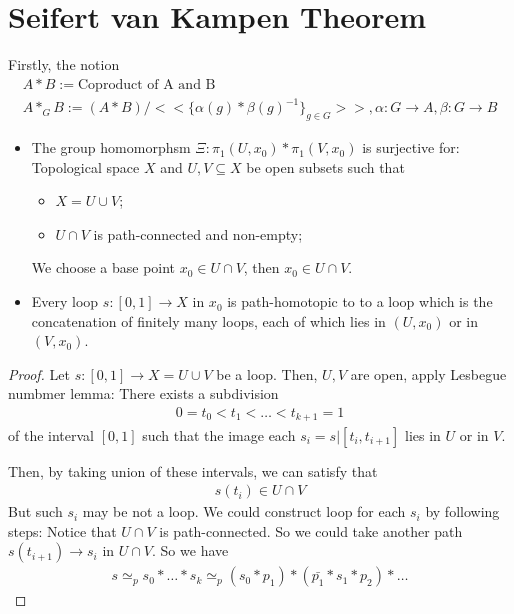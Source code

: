 \documentclass[Total.tex]{subfiles}
\begin{document}
	\section{Seifert van Kampen Theorem}
	Firstly, the notion
	\begin{gather*}
		A*B:=\mbox{Coproduct of A and B}\\
		A*_G B:=(A*B)/<<\{\alpha(g)*\beta(g)^{-1}\}_{g\in G}>>,\alpha:G\rightarrow A,\beta:G\rightarrow B
	\end{gather*}
	\begin{center}
	\end{center}
	\begin{lemma}
		\begin{itemize}
			\item The group homomorphsm $\Xi:\pi_1(U,x_0)*\pi_1(V,x_0)$ is surjective for: Topological space $X$ and $U,V\subseteq X$ be open subsets such that
			\begin{itemize}
				\item $X=U\cup V$;
				\item $U\cap V$ is path-connected and non-empty;
			\end{itemize}
			We choose a base point $x_0\in U\cap V$, then $x_0\in U\cap V$. 
			\item Every loop $s:[0,1]\rightarrow X$ in $x_0$ is path-homotopic to to a loop which is the concatenation of finitely many loops, each of which lies in $(U,x_0)$ or in $(V,x_0)$.
		\end{itemize}
	\end{lemma}
	\begin{proof}
		Let $s:[0,1]\rightarrow X=U\cup V$ be a loop. Then, $U,V$ are open, apply Lesbegue numbmer lemma: There exists a subdivision
		\begin{gather*}
			0=t_0<t_1<\dots<t_{k+1}=1	
		\end{gather*}
		of the interval $[0,1]$ such that the image each $s_i=s|[t_i,t_{i+1}]$ lies in $U$ or in $V$. 
		
		Then, by taking union of these intervals, we can satisfy that
		\begin{gather*}
			s(t_i)\in U\cap V
		\end{gather*}
		But such $s_i$ may be not a loop. We could construct loop for each $s_i$ by following steps: Notice that $U\cap V$ is path-connected. So we could take another path $s(t_{i+1})\rightarrow s_i$ in $U\cap V$. So we have
		\begin{gather*}
			s\simeq_p s_0*\dots*s_k\simeq_p (s_0*p_1)*(\bar{p_1}*s_1*p_2)*\dots 
		\end{gather*}
	\end{proof}
\end{document}
